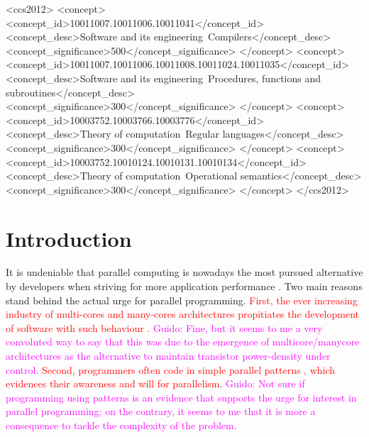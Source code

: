 \documentclass[sigplan,10pt,review,anonymous]{acmart}
\newcommand{\guido}[1]{\noindent\textcolor{magenta}{Guido: {#1}}}
\newcommand{\ed}[1]{\noindent\textcolor{red}{ {#1}}}
\newcommand{\guido}[1]{}
\newcommand{\ed}[1]{}
\begin{document}
 \begin{CCSXML}
<ccs2012>
<concept>
<concept_id>10011007.10011006.10011041</concept_id>
<concept_desc>Software and its engineering~Compilers</concept_desc>
<concept_significance>500</concept_significance>
</concept>
<concept>
<concept_id>10011007.10011006.10011008.10011024.10011035</concept_id>
<concept_desc>Software and its engineering~Procedures, functions and subroutines</concept_desc>
<concept_significance>300</concept_significance>
</concept>
<concept>
<concept_id>10003752.10003766.10003776</concept_id>
<concept_desc>Theory of computation~Regular languages</concept_desc>
<concept_significance>300</concept_significance>
</concept>
<concept>
<concept_id>10003752.10010124.10010131.10010134</concept_id>
<concept_desc>Theory of computation~Operational semantics</concept_desc>
<concept_significance>300</concept_significance>
</concept>
</ccs2012>
\end{CCSXML}



\maketitle

\section{Introduction}
\label{sec:intro}

It is undeniable that parallel computing is nowadays the most pursued alternative by developers  when striving for more application performance \cite{hwu2014ahead}. Two main reasons stand behind  the actual urge for parallel programming. \ed{First, the ever  increasing industry of multi-cores and many-cores architectures propitiates the development of software  with such behaviour \cite{haugen2016performance, vandierendonck2013analysis}.} \guido{Fine, but it seems to me a very convoluted way to say that this was due to the emergence of multicore/manycore  architectures as the alternative to maintain transistor power-density under control.} \ed{Second, programmers often code in simple parallel patterns  \cite{pinto2015large}, which evidences their awareness and will for parallelism}. \guido{Not sure if programming using patterns is an evidence that supports the urge for interest in parallel programming; on the contrary, it seems to me that it is more a consequence to tackle the complexity of the problem.} 
\end{document}
